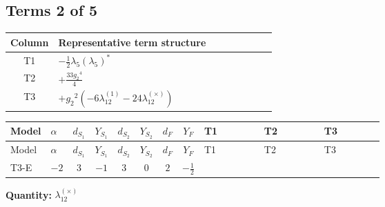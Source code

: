 \documentclass[8pt]{article}
\begin{document}
\begin{landscape}
\subsection*{Terms 2 of 5}
\begin{center}
\begin{tabular}{@{}c >{\raggedright\arraybackslash}p{0.82\linewidth}@{}}
\toprule
Column & Representative term structure \\
\midrule
T1 & \(\displaystyle -\frac{1}{2} {\lambda_5} \left({\lambda_5}\right)^{*}\) \\
\midrule
T2 & \(\displaystyle +\frac{33 {g_2}^4}{4}\) \\
\midrule
T3 & \(\displaystyle +{g_2}^2 (-6 {\lambda_{12}^{(1)}}-24 {\lambda_{12}^{(\times)}})\) \\
\midrule
\bottomrule
\end{tabular}
\end{center}
\smallskip
\tiny
\begin{longtable}{@{}llcccccc >{\raggedright\arraybackslash}p{0.21\linewidth} >{\raggedright\arraybackslash}p{0.21\linewidth} >{\raggedright\arraybackslash}p{0.21\linewidth}@{}}
\toprule
Model & $\alpha$ & $d_{S_1}$ & $Y_{S_1}$ & $d_{S_2}$ & $Y_{S_2}$ & $d_F$ & $Y_F$ & T1 & T2 & T3 \\
\midrule
\endfirsthead
\toprule
Model & $\alpha$ & $d_{S_1}$ & $Y_{S_1}$ & $d_{S_2}$ & $Y_{S_2}$ & $d_F$ & $Y_F$ & T1 & T2 & T3 \\
\midrule
\endhead
T3-E & $-2$ & $3$ & $-1$ & $3$ & $0$ & $2$ & $-\frac{1}{2}$ & \scriptsize\adjustbox{max width=\linewidth}{$\begin{gathered} -\frac{1}{2} {\lambda_5} \left({\lambda_5}\right)^{*}\end{gathered}$} & \scriptsize\adjustbox{max width=\linewidth}{$\begin{gathered} +\frac{33 {g_2}^4}{4}\end{gathered}$} & \scriptsize\adjustbox{max width=\linewidth}{$\begin{gathered} +{g_2}^2 (-6 {\lambda_{12}^{(1)}}-24 {\lambda_{12}^{(\times)}})\end{gathered}$} \\
\midrule
\bottomrule
\end{longtable}
\clearpage
\noindent\textbf{Quantity: }$\lambda_{12}^{(\times)}$\par\smallskip

\end{landscape}
\end{document}

